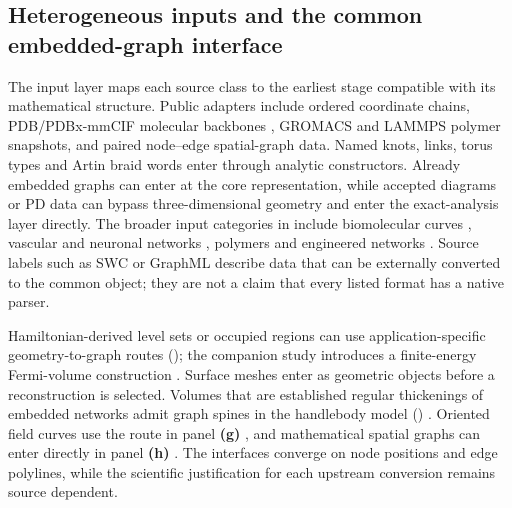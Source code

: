 \subsection{Heterogeneous inputs and the common embedded-graph interface}
\label{supp:input_examples}
The input layer maps each source class to the earliest stage compatible with its mathematical structure. Public adapters include ordered coordinate chains, PDB/PDBx-mmCIF molecular backbones \cite{kg_burley2019rcsb,kg_bourne1997mmcif}, GROMACS \cite{kg_abraham2015gromacs} and LAMMPS \cite{kg_thompson2022lammps} polymer snapshots, and paired node--edge spatial-graph data. Named knots, links, torus types and Artin braid words enter through analytic constructors. Already embedded graphs can enter at the core representation, while accepted diagrams or PD data can bypass three-dimensional geometry and enter the exact-analysis layer directly. The broader input categories in  include biomolecular curves \cite{kg_yeates2007protein_topology}, vascular and neuronal networks \cite{kg_aylward2005spatial_vascular,kg_cuntz2010neuronal_graphs}, polymers \cite{kg_deguchi2017topological_polymers} and engineered networks \cite{kg_shai1999engineering_graphs,kg_peddada2023}. Source labels such as SWC or GraphML describe data that can be externally converted to the common object; they are not a claim that every listed format has a native parser.

Hamiltonian-derived level sets or occupied regions can use application-specific geometry-to-graph routes (); the companion study introduces a finite-energy Fermi-volume construction \cite{akgun_yan_2026topologicalclassificationknottedgraphs}. Surface meshes enter as geometric objects before a reconstruction is selected. Volumes that are established regular thickenings of embedded networks admit graph spines in the handlebody model () \cite{kg_ishii2008handlebody,kg_ishii2012handlebody}. Oriented field curves use the route in panel \textbf{(g)} \cite{kg_helman1989vector_field_topology}, and mathematical spatial graphs can enter directly in panel \textbf{(h)} \cite{kg_kauffman1989spatial,kg_flapan2017spatial}. The interfaces converge on node positions and edge polylines, while the scientific justification for each upstream conversion remains source dependent.

